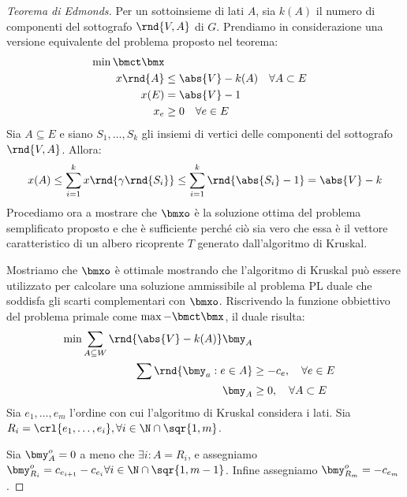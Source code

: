 \documentclass[\main/main.tex]{subfiles}
\begin{document}
\begin{proof}[Teorema di Edmonds]
  Per un sottoinsieme di lati \(A\), sia \(k(A)\) il numero di componenti del sottografo \(\rnd{V, A}\) di \(G\). Prendiamo in considerazione una versione equivalente del problema proposto nel teorema:
  \begin{align*}
    \min \bmct\bmx                                           \\
    x\rnd{A} & \leq \abs{V} - k(A) \quad \forall A \subset E \\
    x(E)     & = \abs{V} -1                                  \\
    x_e      & \geq 0 \quad \forall e \in E
  \end{align*}
  Sia \(A \subseteq E\) e siano \(S_1, \ldots, S_k\) gli insiemi di vertici delle componenti del sottografo \(\rnd{V, A}\). Allora:
  \[
    x(A) \leq \sum_{i=1}^k x\rnd{\gamma\rnd{S_i}} \leq \sum_{i=1}^k \rnd{\abs{S_i}-1} = \abs{V} - k
  \]
  Procediamo ora a mostrare che \(\bmxo\) è la soluzione ottima del problema semplificato proposto e che è sufficiente perché ciò sia vero che essa è il vettore caratteristico di un albero ricoprente \(T\) generato dall'algoritmo di Kruskal.

  Mostriamo che \(\bmxo\) è ottimale mostrando che l'algoritmo di Kruskal può essere utilizzato per calcolare una soluzione ammissibile al problema PL duale che soddisfa gli scarti complementari con \(\bmxo\). Riscrivendo la funzione obbiettivo del problema primale come \(\max -\bmct\bmx \), il duale risulta:
  \begin{align*}
    \min \sum_{A \subseteq W} \rnd{\abs{V} - k(A)}\bmy_A           \\
    \sum \rnd{\bmy_a: e \in A} & \geq -c_e, \quad \forall e \in E  \\
    \bmy_A                     & \geq 0, \quad \forall A \subset E
  \end{align*}
  Sia \(e_1, \ldots, e_m\) l'ordine con cui l'algoritmo di Kruskal considera i lati. Sia \(R_i = \crl{e_1, \ldots, e_i}, \forall i \in \N \cap \sqr{1, m}\).

  Sia \(\bmy_A^o=0\) a meno che \(\exists i: A = R_i\), e assegniamo \(\bmy^o_{R_i} = c_{e_{i+1}} - c_{e_{i}} \forall i \in \N \cap \sqr{1, m-1}\). Infine assegniamo \(\bmy^o_{R_m} = -c_{e_m}\).


\end{proof}
\end{document}
